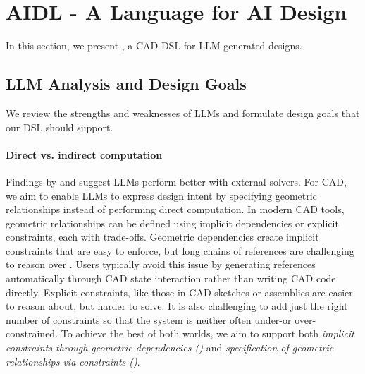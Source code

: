 

\section{AIDL - A Language for AI Design}
\label{sec:dsl}




In this section, we present \langname{}, a CAD DSL for LLM-generated designs.



\subsection{LLM Analysis and Design Goals}
\label{sec:analysis_llm}
We review the strengths and weaknesses of LLMs and formulate design goals that our DSL should support.


\paragraph{Direct vs. indirect computation}
Findings by \cite{bubeck2023sparks} and \cite{makatura2023can} suggest LLMs perform better with external solvers. For CAD, we aim to enable LLMs to express design intent by specifying geometric relationships instead of performing direct computation. In modern CAD tools, geometric relationships can be defined using implicit dependencies or explicit constraints, each with trade-offs. Geometric dependencies create implicit constraints that are easy to enforce, but long chains of references are challenging to reason over \citep{makatura2023can}. 
Users typically avoid this issue by generating references automatically through CAD state interaction rather than writing CAD code directly. Explicit constraints, like those in CAD sketches or assemblies are easier to reason about, but harder to solve. It is also challenging to add just the right number of constraints so that the system is neither 
often under-or over-constrained. 
To achieve the best of both worlds, we aim to support both \emph{implicit constraints through geometric dependencies (\dgone{})} and \emph{specification of geometric relationships via constraints (\dgtwo{})}. 


